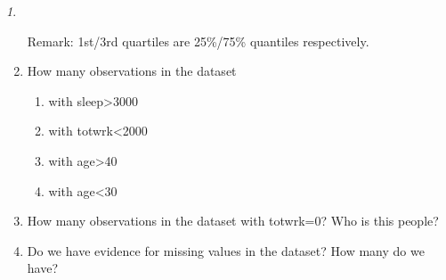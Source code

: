 \documentclass[12pt]{article}
\theoremstyle{remark}
\newtheorem{problem}{}[section]
\begin{document}
\begin{problem}
\begin{enumerate}
	Remark: 1st/3rd quartiles are 25\%/75\% quantiles respectively.
	\item How many observations in the dataset 
	\begin{enumerate}
		\item with sleep>3000
		\item with totwrk<2000
		\item with age>40
		\item with age<30
	\end{enumerate}
	\item How many observations in the dataset with totwrk=0? 
	Who is this people?
	\item Do we have evidence for missing values in the dataset?
	How many do we have?
\end{enumerate}
\end{problem}
\end{document}
